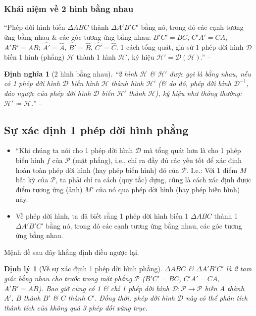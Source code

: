 \documentclass[oneside]{book}
\numberwithin{equation}{section}
\newtheorem{dinhnghia}{Định nghĩa}[section]
\newtheorem{dinhly}{Định lý}[section]
\begin{document}
\subsubsection{Khái niệm về 2 hình bằng nhau}
``Phép dời hình biến $\Delta ABC$ thành $\Delta A'B'C'$ bằng nó, trong đó các cạnh tương ứng bằng nhau \& các góc tương ứng bằng nhau: $B'C' = BC$, $C'A' = CA$, $A'B' = AB$; $\widehat{A'} = \widehat{A}$, $\widehat{B'} = \widehat{B}$, $\widehat{C'} = \widehat{C}$. 1 cách tổng quát, giả sử 1 phép dời hình $\mathcal{D}$ biến 1 hình (phẳng) $\mathcal{H}$ thành 1 hình $\mathcal{H}'$, ký hiệu $\mathcal{H}' = \mathcal{D}(\mathcal{H})$.'' -- \cite[pp. 6--7]{TL_chuyen_Toan_Hinh_Hoc_11}

\begin{dinhnghia}[2 hình bằng nhau]
	``2 hình $\mathcal{H}$ \& $\mathcal{H}'$ được gọi là \emph{bằng nhau}, nếu có 1 phép dời hình $\mathcal{D}$ biến hình $\mathcal{H}$ thành hình $\mathcal{H}'$ (\& do đó, phép dời hình $\mathcal{D}^{-1}$, đảo ngược của phép dời hình $\mathcal{D}$ biến $\mathcal{H}'$ thành $\mathcal{H}$), ký hiệu như thông thường: $\mathcal{H}'\coloneqq\mathcal{H}$.'' -- \cite[p. 7]{TL_chuyen_Toan_Hinh_Hoc_11}
\end{dinhnghia}

\subsection{Sự xác định 1 phép dời hình phẳng}
\begin{itemize}
	\item ``Khi chúng ta nói cho 1 phép dời hình $\mathcal{D}$ mà tổng quát hơn là cho 1 phép biến hình $f$ của $\mathcal{P}$ (mặt phẳng), i.e., chỉ ra đầy đủ các yếu tốt để xác định hoàn toàn phép dời hình (hay phép biến hình) đó của $\mathcal{P}$. I.e.: Với 1 điểm $M$ bất kỳ của $\mathcal{P}$, ta phải chỉ ra cách (quy tắc) dựng, cũng là cách xác định được điểm tương ứng (ảnh) $M'$ của nó qua phép dời hình (hay phép biến hình) này.
	\item Về phép dời hình, ta đã biết rằng 1 phép dời hình biến 1 $\Delta ABC$ thành 1 $\Delta A'B'C'$ bằng nó, trong đó các cạnh tương ứng bằng nhau, các góc tương ứng bằng nhau.
\end{itemize}
Mệnh đề sau đây khẳng định điều ngược lại.

\begin{dinhly}[Về sự xác định 1 phép dời hình phẳng]
	$\Delta ABC$ \& $\Delta A'B'C'$ là 2 tam giác bằng nhau cho trước trong mặt phẳng $\mathcal{P}$ ($B'C' = BC$, $C'A' = CA$, $A'B' = AB$). Bao giờ cũng có 1 \& chỉ 1 phép dời hình $\mathcal{D}:\mathcal{P}\to\mathcal{P}$ biến $A$ thành $A'$, $B$ thành $B'$ \& $C$ thành $C'$. Đồng thời, phép dời hình $\mathcal{D}$ này có thể phân tích thành tích của không quá 3 phép đối xứng trục.
\end{dinhly}
\end{document}

